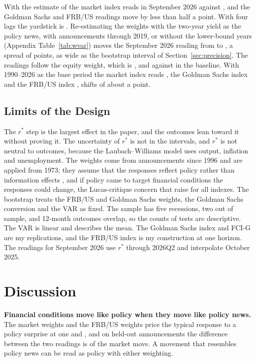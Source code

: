 \documentclass[11pt]{article}
\newcommand{\rs}{r^{*}}
\begin{document}


With the estimate of \citet{kiley2020} the market index reads  in September 2026 against , and the Goldman Sachs and FRB/US readings move by less than half a point. With four lags the yardstick is . Re-estimating the weights with the two-year yield as the policy news, with announcements through 2019, or without the lower-bound years (Appendix Table~\ref{tab:wvar}) moves the September 2026 reading from  to , a spread of  points, as wide as the bootstrap interval of Section~\ref{sec:precision}. The readings follow the equity weight, which is ,  and  against  in the baseline. With 1990--2026 as the base period the market index reads , the Goldman Sachs index  and the FRB/US index , shifts of about a point.

\subsection{Limits of the Design}\label{sec:limits}
The $\rs$ step is the largest effect in the paper, and the outcomes lean toward it without proving it. The uncertainty of $\rs$ is not in the intervals, and $\rs$ is not neutral to outcomes, because the Laubach--Williams model uses output, inflation and unemployment. The weights come from announcements since 1996 and are applied from 1973; they assume that the responses reflect policy rather than information effects \citep{nakamura2018}, and if policy came to target financial conditions the responses could change, the Lucas-critique concern that \citet{hatzius2010} raise for all indexes. The bootstrap treats the FRB/US and Goldman Sachs weights, the Goldman Sachs conversion and the VAR as fixed. The sample has five recessions, two out of sample, and 12-month outcomes overlap, so the counts of tests are descriptive. The VAR is linear and describes the mean. The Goldman Sachs index and FCI-G are my replications, and the FRB/US index is my construction at one horizon. The readings for September 2026 use $\rs$ through 2026Q2 and interpolate October 2025.


\section{Discussion}\label{sec:discussion}
\textbf{Financial conditions move like policy when they move like policy news.} The market weights and the FRB/US weights price the typical response to a policy surprise at one and , and on held-out announcements the difference between the two readings is  of the market move. A movement that resembles policy news can be read as policy with either weighting.
\end{document}
